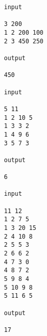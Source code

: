 \begin{verbatim}
input 
 
3 200 
1 2 200 100 
2 3 450 250 
 
output 
 
450

input 
 
5 11 
1 2 10 5 
1 3 3 2 
1 4 9 6 
3 5 7 3 
 
output 
 
6

input 
 
11 12 
1 2 7 5 
1 3 20 15 
2 4 10 8 
2 5 5 3 
2 6 6 2 
4 7 3 0 
4 8 7 2 
5 9 8 4 
5 10 9 8 
5 11 6 5 
 
output 
 
17\end{verbatim}

 